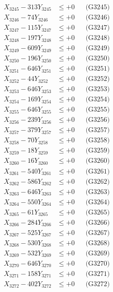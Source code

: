 \documentclass[a4paper,10pt]{article}
\begin{document}
{\begin{align}
X_{3245} - 313Y_{3245} &\leq +0 && \text{(G3245)} \\
X_{3246} - 74Y_{3246} &\leq +0 && \text{(G3246)} \\
X_{3247} - 115Y_{3247} &\leq +0 && \text{(G3247)} \\
X_{3248} - 197Y_{3248} &\leq +0 && \text{(G3248)} \\
X_{3249} - 609Y_{3249} &\leq +0 && \text{(G3249)} \\
X_{3250} - 196Y_{3250} &\leq +0 && \text{(G3250)} \\
\allowbreak
X_{3251} - 646Y_{3251} &\leq +0 && \text{(G3251)} \\
X_{3252} - 44Y_{3252} &\leq +0 && \text{(G3252)} \\
X_{3253} - 646Y_{3253} &\leq +0 && \text{(G3253)} \\
X_{3254} - 169Y_{3254} &\leq +0 && \text{(G3254)} \\
X_{3255} - 646Y_{3255} &\leq +0 && \text{(G3255)} \\
X_{3256} - 239Y_{3256} &\leq +0 && \text{(G3256)} \\
X_{3257} - 379Y_{3257} &\leq +0 && \text{(G3257)} \\
X_{3258} - 70Y_{3258} &\leq +0 && \text{(G3258)} \\
X_{3259} - 18Y_{3259} &\leq +0 && \text{(G3259)} \\
X_{3260} - 16Y_{3260} &\leq +0 && \text{(G3260)} \\
\allowbreak
X_{3261} - 540Y_{3261} &\leq +0 && \text{(G3261)} \\
X_{3262} - 586Y_{3262} &\leq +0 && \text{(G3262)} \\
X_{3263} - 646Y_{3263} &\leq +0 && \text{(G3263)} \\
X_{3264} - 550Y_{3264} &\leq +0 && \text{(G3264)} \\
X_{3265} - 61Y_{3265} &\leq +0 && \text{(G3265)} \\
X_{3266} - 284Y_{3266} &\leq +0 && \text{(G3266)} \\
X_{3267} - 525Y_{3267} &\leq +0 && \text{(G3267)} \\
X_{3268} - 530Y_{3268} &\leq +0 && \text{(G3268)} \\
X_{3269} - 532Y_{3269} &\leq +0 && \text{(G3269)} \\
X_{3270} - 646Y_{3270} &\leq +0 && \text{(G3270)} \\
\allowbreak
X_{3271} - 158Y_{3271} &\leq +0 && \text{(G3271)} \\
X_{3272} - 402Y_{3272} &\leq +0 && \text{(G3272)} \\

\end{align}}
\end{document}
